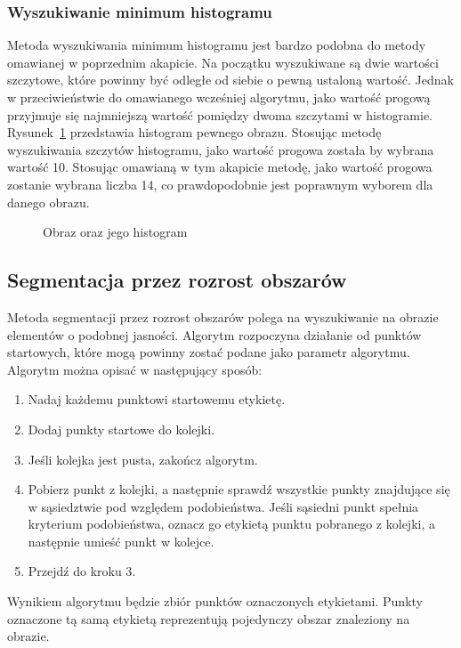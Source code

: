 \subsubsection{Wyszukiwanie minimum histogramu}
Metoda wyszukiwania minimum histogramu jest bardzo podobna do metody omawianej w poprzednim akapicie. Na początku wyszukiwane są dwie wartości szczytowe, które powinny być odległe od siebie o pewną ustaloną wartość. Jednak w przeciwieństwie do omawianego wcześniej algorytmu, jako wartość progową przyjmuje się najmniejszą wartość pomiędzy dwoma szczytami w histogramie. \\
Rysunek~\ref{fig:histogram_valleys} przedstawia histogram pewnego obrazu. Stosując metodę wyszukiwania szczytów histogramu, jako wartość progowa została by wybrana wartość 10. Stosując omawianą w tym akapicie metodę, jako wartość progowa zostanie wybrana liczba 14, co prawdopodobnie jest poprawnym wyborem dla danego obrazu.

\begin{figure}
  \centering
  \caption{Obraz oraz jego histogram}
  \label{fig:histogram_valleys}
\end{figure}

\subsection{Segmentacja przez rozrost obszarów}
Metoda segmentacji przez rozrost obszarów polega na wyszukiwanie na obrazie elementów o podobnej jasności. Algorytm rozpoczyna działanie od punktów startowych, które mogą powinny zostać podane jako parametr algorytmu. Algorytm można opisać w następujący sposób:
\begin{enumerate}
  \item Nadaj każdemu punktowi startowemu etykietę.
  \item Dodaj punkty startowe do kolejki.
  \item Jeśli kolejka jest pusta, zakończ algorytm.
  \item Pobierz punkt z kolejki, a następnie sprawdź wszystkie punkty znajdujące się w sąsiedztwie pod względem podobieństwa. Jeśli sąsiedni punkt spełnia kryterium podobieństwa, oznacz go etykietą punktu pobranego z kolejki, a następnie umieść punkt w kolejce.
  \item Przejdź do kroku 3.
\end{enumerate}
Wynikiem algorytmu będzie zbiór punktów oznaczonych etykietami. Punkty oznaczone tą samą etykietą reprezentują pojedynczy obszar znaleziony na obrazie.


